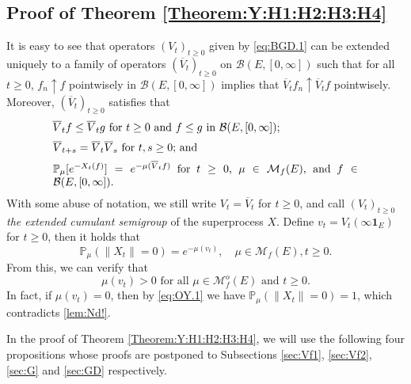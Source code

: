\documentclass[12pt,a4paper]{amsart}
\numberwithin{equation}{section}
\theoremstyle{plain}
\theoremstyle{definition}
\theoremstyle{remark}
\begin{document}
\subsection{Proof of Theorem \ref{Theorem:Y:H1:H2:H3:H4}} \label{subsec:OY}
	It is easy to see that operators $(V_t)_{t\geq 0}$ 
	given by \eqref{eq:BGD.1} can be extended uniquely to a family of operators $(\overline V_t)_{t\geq 0}$ on $\mathcal B(E,[0,\infty])$ such that for all $t\geq 0$, $f_n \uparrow f$ pointwisely in  $\mathcal B(E, [0,\infty])$ implies that $\overline V_tf_n \uparrow \overline V_tf$ pointwisely.
	Moreover, $(\overline V_t)_{t\geq 0}$ satisfies that
\begin{equation}
\begin{minipage}{0.8\textwidth}
	$\overline V_t f \leq \overline V_t g$ for $t\geq 0$ and $f\leq g$ in $\mathcal B(E,[0,\infty])$;
\end{minipage}\label{Fact:BV!}
\end{equation}
\begin{equation}
\begin{minipage}{0.8\textwidth}
	$\overline V_{t+s} = \overline V_t \overline V_s$ for $t, s\geq 0$;  and
\end{minipage} \label{eq:OY.0}
\end{equation}
\begin{equation}
\begin{minipage}{0.8\textwidth}
	$\mathbb P_\mu [e^{-X_t(f)}] = e^{- \mu(\overline V_tf)}$ for $t\geq 0$, $\mu \in \mathcal M_f(E)$, and $f\in \mathcal B(E,[0,\infty])$.
\end{minipage} \label{eq:BGD.2}
\end{equation}
	With some abuse of notation, we still write $V_t = \overline V_t$ for $t\geq 0$, and call $(V_t)_{t\geq 0}$ \emph{the extended cumulant semigroup} of the superprocess $X$.
	Define $v_t = V_t(\infty \mathbf 1_E)$ for $t\geq 0$, then it holds that
\begin{equation} \label{eq:OY.1}
	\mathbb P_\mu (\|X_t\| = 0)
	= e^{- \mu (v_t)},
	\quad \mu \in \mathcal M_f(E), t\geq 0.
\end{equation}
	From this, we can verify that
\begin{equation}\label{lem:sv2!}
	\text{$\mu(v_t) > 0$ for all $\mu \in \mathcal M_f^o(E)$ and $t \geq 0$.}
\end{equation}
	In fact, if $\mu(v_t) = 0$, then by \eqref{eq:OY.1} we have $\mathbb P_\mu(\|X_t \| = 0) = 1$, which contradicts \eqref{lem:Nd!}.

	In the  proof of Theorem \ref{Theorem:Y:H1:H2:H3:H4}, we will use the following four propositions whose proofs are postponed to Subsections \ref{sec:Vf1}, \ref{sec:Vf2}, \ref{sec:G} and \ref{sec:GD} respectively.
\end{document}
